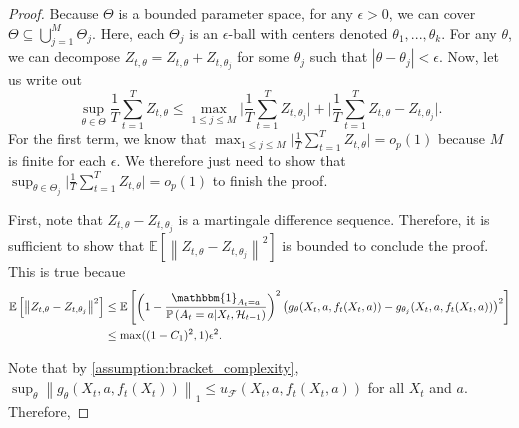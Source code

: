 \documentclass[11pt]{article}
\newcommand{\E}{\mathbb{E}}
\newcommand{\norm}[1]{\left\lVert#1\right\rVert}
\begin{document}
\begin{appendix}
\begin{proof}
Because $\Theta$ is a bounded parameter space, for any $\epsilon>0$, we can cover $\Theta \subseteq \bigcup_{j=1}^{M} \Theta_{j}$. Here, each $\Theta_j$ is an $\epsilon$-ball with centers denoted $\theta_1,...,\theta_k$. For any $\theta$, we can decompose $Z_{t,\theta} = Z_{t,\theta} + Z_{t,\theta_j}$ for some $\theta_j$ such that $|\theta - \theta_j| < \epsilon$. Now, let us write out
$$\sup_{\theta \in\Theta}\frac{1}{T}\sum_{t=1}^{T}Z_{t,\theta} \le \max_{1\le j \le M} \lvert\frac{1}{T}\sum_{t=1}^{T}Z_{t,\theta_j} \rvert +  \lvert\frac{1}{T}\sum_{t=1}^{T}Z_{t,\theta} - Z_{t,\theta_j}\rvert.$$
For the first term, we know that $ \max_{1\le j \le M}\lvert\frac{1}{T}\sum_{t=1}^{T}Z_{t,\theta} \rvert = o_{p}(1)$ because $M$ is finite for each $\epsilon$. We therefore just need to show that $\sup_{\theta \in \Theta_{j}} \lvert\frac{1}{T}\sum_{t=1}^{T}Z_{t,\theta}\rvert =o_{p}(1)$ to finish the proof.

First, note that $Z_{t,\theta} - Z_{t,\theta_j}$ is a martingale difference sequence. Therefore, it is sufficient to show that $ \E \left[\norm{Z_{t,\theta} - Z_{t,\theta_j}}^{2}\right]$ is bounded to conclude the proof. This is true becaue
\begin{align*}
    \E \left[\norm{Z_{t,\theta} - Z_{t,\theta_j}}^{2}\right] &\le \E \left[\left(1 - \frac{\mathbbm{1}_{A_{t} = a} }{\mathbb{P} \left(A_{t} =a | X_{t},\mathcal{H}_{t-1} \right)}\right)^{2} \left( g_{\theta}(X_{t},a,f_{t}(X_{t},a))  - g_{\theta_{j}}(X_{t},a,f_{t}(X_{t},a)) \right)^{2} \right] \\
    &\le \max((1-C_{1})^{2},1)\epsilon^{2}.\\
\end{align*}




 \iffalse
 Note that by \cref{assumption:bracket_complexity}, 
 $\sup_{\theta} \norm{g_{\theta}(X_t,a,f_{t}(X_t))}_{1} \le u_{\mathcal{F}}(X_{t},a,f_{t}(X_{t},a))$ for all $X_t$ and $a$. Therefore, 


\end{proof}
\end{appendix}
\end{document}
